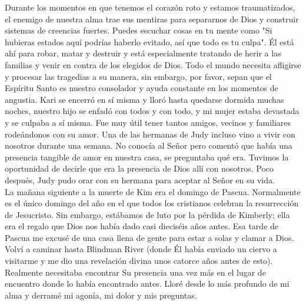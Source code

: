 \documentclass[twoside, 12pt]{book}
\begin{document}
Durante los momentos en que tenemos el corazón roto y estamos traumatizados, el enemigo de nuestra alma trae sus mentiras para separarnos de Dios y construir sistemas de creencias fuertes. Puedes escuchar cosas en tu mente como "Si hubieras estados aquí podrías haberlo evitado, así que todo es tu culpa". Él está ahí para robar, matar y destruir y está especialmente tratando de herir a las familias y venir en contra de los elegidos de Dios. Todo el mundo necesita afligirse y procesar las tragedias a su manera, sin embargo, por favor, sepan que el Espíritu Santo es nuestro consolador y ayuda constante en los momentos de angustia. Kari se encerró en sí misma y lloró hasta quedarse dormida muchas noches, nuestro hijo se enfadó con todos y con todo, y mi mujer estaba devastada y se culpaba a sí misma.
Fue muy útil tener tantos amigos, vecinos y familiares rodeándonos con su amor. Una de las hermanas de Judy incluso vino a vivir con nosotros durante una semana. No conocía al Señor pero comentó que había una presencia tangible de amor en nuestra casa, se preguntaba qué era. Tuvimos la oportunidad de decirle que era la presencia de Dios allí con nosotros. Poco después, Judy pudo orar con su hermana para aceptar al Señor en su vida.\\

La mañana siguiente a la muerte de Kim era el domingo de Pascua. Normalmente es el único domingo del año en el que todos los cristianos celebran la resurrección de Jesucristo. Sin embargo, estábamos de luto por la pérdida de Kimberly; ella era el regalo que Dios nos había dado casi dieciséis años antes. Esa tarde de Pascua me excusé de una casa llena de gente para estar a solas y clamar a Dios. Volví a caminar hasta Blindman River (donde Él había enviado un ciervo a visitarme y me dio una revelación divina unos catorce años antes de esto). Realmente necesitaba encontrar Su presencia una vez más en el lugar de encuentro donde lo había encontrado antes. Lloré desde lo más profundo de mi alma y derramé mi agonía, mi dolor y mis preguntas.\\
\end{document}

